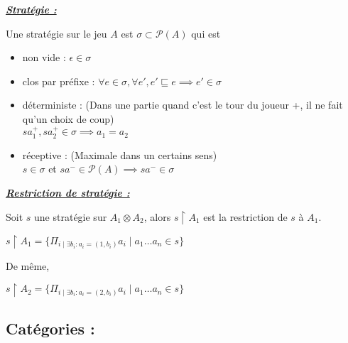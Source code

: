 \documentclass[a4paper,12ptCOUCOU
]{article}
\newlength{\mydepth}
\newlength{\myheight}
\newenvironment{answer}
{\par\begin{lrbox}{\mybox}\quad\begin{minipage}{\linewidth}\color{black}\setlength{\parskip}{10pt plus 1pt minus 1pt}\vspace*{-.7\baselineskip}}
{\end{minipage}\end{lrbox}
\settodepth{\mydepth}{\usebox{\mybox}}
\settoheight{\myheight}{\usebox{\mybox}}
\addtolength{\myheight}{\mydepth}
\noindent\makebox[0pt]{
  \color{gray}\hspace{-0pt}\rule[-\mydepth]{1pt}{\myheight}}
\usebox{\mybox}
  }
\begin{document}
\begin{samepage}\textbf{\textit{\underline{ Stratégie : }}} \begin{answer}
Une stratégie sur le jeu $A$ est $\sigma \subset \mathcal{P}(A)$ qui est
\begin{itemize}
\item non vide :
$\epsilon \in \sigma$

\item clos par préfixe :
$\forall e \in \sigma, \forall e', e' \sqsubseteq e \implies e' \in \sigma$

\item déterministe :
(Dans une partie quand c'est le tour du joueur +, il ne fait qu'un choix de
coup)\\
$sa_1^+, sa_2^+ \in \sigma \implies a_1 = a_2$

\item réceptive :
(Maximale dans un certains sens)\\
$s \in \sigma$ et $sa^- \in \mathcal{P}(A) \implies sa^- \in \sigma$
\end{itemize}
\end{answer}\end{samepage}

\begin{samepage}\textbf{\textit{\underline{ Restriction de stratégie : }}} \begin{answer}
Soit $s$ une stratégie sur $A_1 \otimes A_2$, alors $s\upharpoonright A_1$ est la
restriction de $s$ à $A_1$.

$s\upharpoonright A_1 = \{\Pi_{i \mid \exists b_i : a_i = (1, b_i)} a_i \mid a_1 \dots a_n \in s\}$

De même,

$s\upharpoonright A_2 = \{\Pi_{i \mid \exists b_i : a_i = (2, b_i)} a_i \mid a_1 \dots a_n \in s\}$
\end{answer}\end{samepage}

\subsection{Catégories :}
\end{document}
